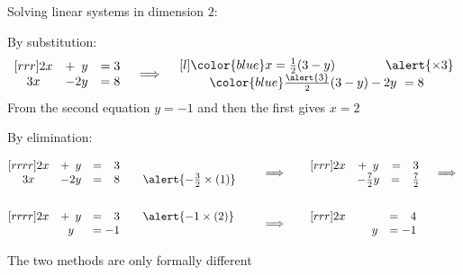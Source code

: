 \documentclass%
[handout]%
{beamer}
\newcommand\blue[1]{{\color{blue} #1}}
\begin{document}

\begin{frame}[label=solving-2]{Solving linear systems in dimension $2$:}

\begin{block}{By substitution:}
    \[ \begin{matrix}[rrr]
        2x &+ \hphantom{2}y &= 3 \\
        3x &- 2y &= 8
    \end{matrix}
    \quad \implies \quad
    \begin{matrix}[l]
        \blue{x = \tfrac12(3-y)} \qquad\qquad \alert{\times 3} \\
        \blue{\tfrac{\alert{3}}2(3-y)} - 2y\ = 8
     \end{matrix}
    \]
    From the second equation $y=-1$ and then the first gives $x=2$
\end{block}

\begin{block}{By elimination:}

\vspace*{-10pt}

    \begin{alignat*}{3}
        &\begin{matrix}[rrrr]
        2x &+ \hphantom{2}y &= \hphantom{-}3 &\\
        3x &- 2y &= \hphantom{-}8 & \quad \alert{-\tfrac32\times(1)}
        \end{matrix}
    &\quad &\implies &\quad
        &\begin{matrix}[rrr]
        2x &+ \hphantom{2}y &= \hphantom{-}3\\
            & -\tfrac72y &= \hphantom{-}\tfrac72
        \end{matrix}
    \quad \implies
    \\  \\
    &\begin{matrix}[rrrr]
        2x &+ \hphantom{2}y &= \hphantom{-}3 & \quad \alert{ - 1\times(2)}\\
            & y &= -1 &
        \end{matrix}
     &\quad &\implies &\quad
     &\begin{matrix}[rrr]
        2x &   &= \hphantom{-}4\\
           &\hphantom{-2} y &= -1
      \end{matrix}
  \end{alignat*}
\end{block}

The two methods are only formally different

\end{frame}
\end{document}
